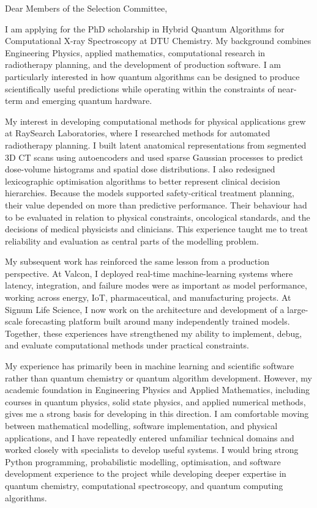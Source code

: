 \documentclass[11pt,a4paper]{moderncv}
\begin{document}
\makecvtitle
Dear Members of the Selection Committee,

\vspace*{2em}
I am applying for the PhD scholarship in Hybrid Quantum Algorithms for Computational X-ray Spectroscopy at DTU Chemistry. My background combines Engineering Physics, applied mathematics, computational research in radiotherapy planning, and the development of production software. I am particularly interested in how quantum algorithms can be designed to produce scientifically useful predictions while operating within the constraints of near-term and emerging quantum hardware.

\hspace*{2em}
My interest in developing computational methods for physical applications grew at RaySearch Laboratories, where I researched methods for automated radiotherapy planning. I built latent anatomical representations from segmented 3D CT scans using autoencoders and used sparse Gaussian processes to predict dose-volume histograms and spatial dose distributions. I also redesigned lexicographic optimisation algorithms to better represent clinical decision hierarchies. Because the models supported safety-critical treatment planning, their value depended on more than predictive performance. Their behaviour had to be evaluated in relation to physical constraints, oncological standards, and the decisions of medical physicists and clinicians. This experience taught me to treat reliability and evaluation as central parts of the modelling problem.

\hspace*{2em}
My subsequent work has reinforced the same lesson from a production perspective. At Valcon, I deployed real-time machine-learning systems where latency, integration, and failure modes were as important as model performance, working across energy, IoT, pharmaceutical, and manufacturing projects. At Signum Life Science, I now work on the architecture and development of a large-scale forecasting platform built around many independently trained models. Together, these experiences have strengthened my ability to implement, debug, and evaluate computational methods under practical constraints.

\hspace*{2em}
My experience has primarily been in machine learning and scientific software rather than quantum chemistry or quantum algorithm development. However, my academic foundation in Engineering Physics and Applied Mathematics, including courses in quantum physics, solid state physics, and applied numerical methods, gives me a strong basis for developing in this direction. I am comfortable moving between mathematical modelling, software implementation, and physical applications, and I have repeatedly entered unfamiliar technical domains and worked closely with specialists to develop useful systems. I would bring strong Python programming, probabilistic modelling, optimisation, and software development experience to the project while developing deeper expertise in quantum chemistry, computational spectroscopy, and quantum computing algorithms.
\end{document}
